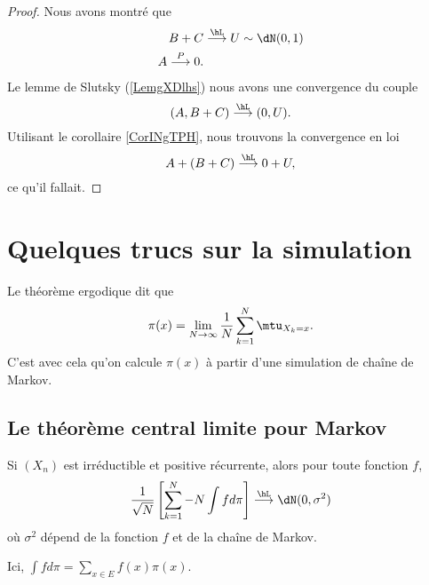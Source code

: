 \begin{proof}
    Nous avons montré que
    \begin{subequations}
        \begin{align}
            B+C&\stackrel{\hL}{\longrightarrow} U\sim\dN(0,1)\\
            A\stackrel{P}{\longrightarrow}0.
        \end{align}
    \end{subequations}
    Le lemme de Slutsky (\ref{LemgXDlhs}) nous avons une convergence du couple
    \begin{equation}
        (A,B+C)\stackrel{\hL}{\longrightarrow}(0,U).
    \end{equation}
    Utilisant le corollaire \ref{CorINgTPH}, nous trouvons la convergence en loi
    \begin{equation}
        A+(B+C)\stackrel{\hL}{\longrightarrow}0+U,
    \end{equation}
    ce qu'il fallait.
\end{proof}

\section{Quelques trucs sur la simulation}

Le théorème ergodique dit que
\begin{equation}
    \pi(x)=\lim_{N\to \infty} \frac{1}{ N }\sum_{k=1}^N\mtu_{X_k=x}.
\end{equation}
C'est avec cela qu'on calcule \( \pi(x)\) à partir d'une simulation de chaîne de Markov.

\subsection{Le théorème central limite pour Markov}

\begin{theorem}
    Si \( (X_n)\) est irréductible et positive récurrente, alors pour toute fonction \( f\),
    \begin{equation}
        \frac{1}{ \sqrt{N} }\left[ \sum_{k=1}^N-N\int fd\pi \right]\stackrel{\hL}{\longrightarrow}\dN(0,\sigma^2)
    \end{equation}
    où \( \sigma^2\) dépend de la fonction \( f\) et de la chaîne de Markov.

   Ici, \( \int fd\pi=\sum_{x\in E}f(x)\pi(x)\).
\end{theorem}

